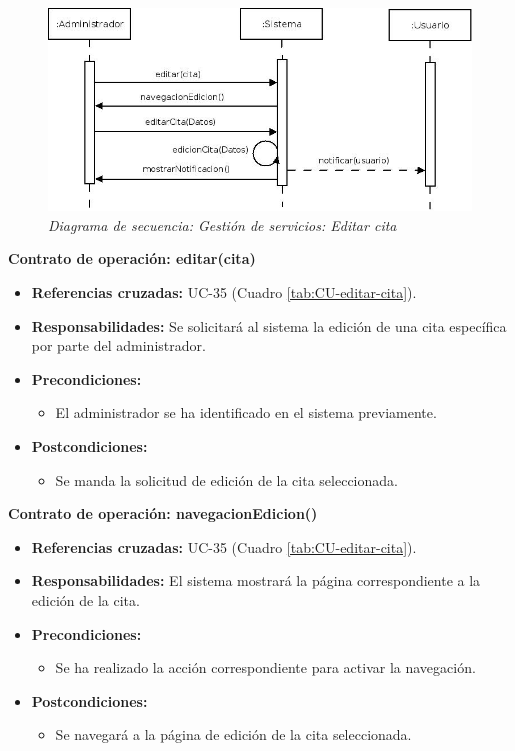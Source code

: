 \begin{figure}[H]
\centering
  \includegraphics[scale=.50]{img/secuencias/gestion-servicios-editar-cita.jpeg}
  \caption{\textit{Diagrama de secuencia: Gestión de servicios: Editar cita}}
  \label{fig:secuencia-gestion-servicios-editar-cita}
\end{figure}

\textbf{Contrato de operación: editar(cita)}
\begin{itemize}
\item \textbf{Referencias cruzadas:} UC-35 (Cuadro \ref{tab:CU-editar-cita}).
\item \textbf{Responsabilidades:} Se solicitará al sistema la edición de una cita específica por parte del administrador.
\item \textbf{Precondiciones:} 
 \begin{itemize}
\item El administrador se ha identificado en el sistema previamente.
\end {itemize}
\item \textbf{Postcondiciones:} 
 \begin{itemize}
\item Se manda la solicitud de edición de la cita seleccionada.
\end {itemize}
\end {itemize}

\textbf{Contrato de operación: navegacionEdicion()}
\begin{itemize}
\item \textbf{Referencias cruzadas:} UC-35 (Cuadro \ref{tab:CU-editar-cita}).
\item \textbf{Responsabilidades:} El sistema mostrará la página correspondiente a la edición de la cita.
\item \textbf{Precondiciones:} 
 \begin{itemize}
\item Se ha realizado la acción correspondiente para activar la navegación.
\end {itemize}
\item \textbf{Postcondiciones:} 
 \begin{itemize}
\item Se navegará a la página de edición de la cita seleccionada.
\end {itemize}
\end {itemize}

